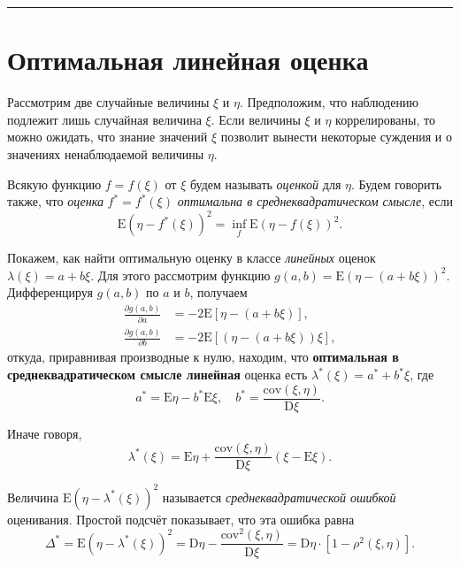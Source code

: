 \documentclass[11pt,a4paper]{article}
\begin{document}
    \begin{center}\rule{0.5\linewidth}{0.5pt}\end{center}

    \hypertarget{ux43eux43fux442ux438ux43cux430ux43bux44cux43dux430ux44f-ux43bux438ux43dux435ux439ux43dux430ux44f-ux43eux446ux435ux43dux43aux430}{%
\section{Оптимальная линейная
оценка}\label{ux43eux43fux442ux438ux43cux430ux43bux44cux43dux430ux44f-ux43bux438ux43dux435ux439ux43dux430ux44f-ux43eux446ux435ux43dux43aux430}}

Рассмотрим две случайные величины \(\xi\) и \(\eta\). Предположим, что
наблюдению подлежит лишь случайная величина \(\xi\). Если величины
\(\xi\) и \(\eta\) коррелированы, то можно ожидать, что знание значений
\(\xi\) позволит вынести некоторые суждения и о значениях ненаблюдаемой
величины \(\eta\).

Всякую функцию \(f = f(\xi)\) от \(\xi\) будем называть \emph{оценкой}
для \(\eta\). Будем говорить также, что \emph{оценка}
\(f^\ast = f^\ast(\xi)\) \emph{оптимальна в среднеквадратическом
смысле}, если
\[ \mathrm{E}(\eta − f^\ast(\xi))^2 = \inf_f \mathrm{E}(\eta − f(\xi))^2. \]

Покажем, как найти оптимальную оценку в классе \emph{линейных} оценок
\(\lambda(\xi) = a + b\xi\). Для этого рассмотрим функцию
\(g(a, b) = \mathrm{E}(\eta − (a+b\xi))^2\). Дифференцируя \(g(a, b)\)
по \(a\) и \(b\), получаем \[
\begin{split}
    \frac{\partial g(a, b)}{\partial a} &= −2 \mathrm{E} \left[ \eta − (a+b\xi) \right], \\
    \frac{\partial g(a, b)}{\partial b} &= −2 \mathrm{E} \left[ (\eta − (a+b\xi))\xi \right],
\end{split}
\] откуда, приравнивая производные к нулю, находим, что
\textbf{оптимальная в среднеквадратическом смысле линейная} оценка есть
\(\lambda^\ast (\xi) = a^\ast + b^\ast \xi\), где \[
    a^\ast = \mathrm{E}\eta − b^\ast\mathrm{E}\xi, \quad b^\ast = \frac{\mathrm{cov}(\xi, \eta)}{\mathrm{D}\xi}.
\]

Иначе говоря, \[
    \lambda^\ast(\xi) = \mathrm{E}\eta + \frac{\mathrm{cov}(\xi, \eta)}{\mathrm{D}\xi} (\xi - \mathrm{E}\xi).
\]

Величина \(\mathrm{E}(\eta − \lambda^\ast(\xi))^2\) называется
\emph{среднеквадратической ошибкой} оценивания. Простой подсчёт
показывает, что эта ошибка равна \[
\Delta^\ast = \mathrm{E}(\eta − \lambda^\ast(\xi))^2 = \mathrm{D}\eta − \frac{\mathrm{cov}^2(\xi, \eta)}{\mathrm{D}\xi} = \mathrm{D}\eta \cdot [1 - \rho^2(\xi, \eta)].
\]
\end{document}
